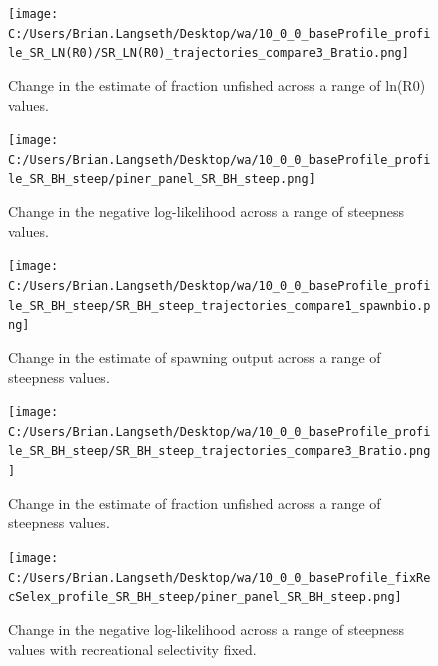 \documentclass[11pt,
  english,
  letterpaper,
]{article}
\begin{document}
\tagmcend\tagstructend


\begin{figure}
\centering
\texttt{[image: C:/Users/Brian.Langseth/Desktop/wa/10\_0\_0\_baseProfile\_profile\_SR\_LN(R0)/SR\_LN(R0)\_trajectories\_compare3\_Bratio.png]}
\caption{Change in the estimate of fraction unfished across a range of ln(R0) values.\label{fig:r0-depl}}
\end{figure}

\tagmcend\tagstructend


\begin{figure}
\centering
\texttt{[image: C:/Users/Brian.Langseth/Desktop/wa/10\_0\_0\_baseProfile\_profile\_SR\_BH\_steep/piner\_panel\_SR\_BH\_steep.png]}
\caption{Change in the negative log-likelihood across a range of steepness values.\label{fig:h-profile}}
\end{figure}

\tagmcend\tagstructend


\begin{figure}
\centering
\texttt{[image: C:/Users/Brian.Langseth/Desktop/wa/10\_0\_0\_baseProfile\_profile\_SR\_BH\_steep/SR\_BH\_steep\_trajectories\_compare1\_spawnbio.png]}
\caption{Change in the estimate of spawning output across a range of steepness values.\label{fig:h-ssb}}
\end{figure}

\tagmcend\tagstructend


\begin{figure}
\centering
\texttt{[image: C:/Users/Brian.Langseth/Desktop/wa/10\_0\_0\_baseProfile\_profile\_SR\_BH\_steep/SR\_BH\_steep\_trajectories\_compare3\_Bratio.png]}
\caption{Change in the estimate of fraction unfished across a range of steepness values.\label{fig:h-depl}}
\end{figure}

\tagmcend\tagstructend


\begin{figure}
\centering
\texttt{[image: C:/Users/Brian.Langseth/Desktop/wa/10\_0\_0\_baseProfile\_fixRecSelex\_profile\_SR\_BH\_steep/piner\_panel\_SR\_BH\_steep.png]}
\caption{Change in the negative log-likelihood across a range of steepness values with recreational selectivity fixed.\label{fig:h-recfix-profile}}
\end{figure}
\end{document}
